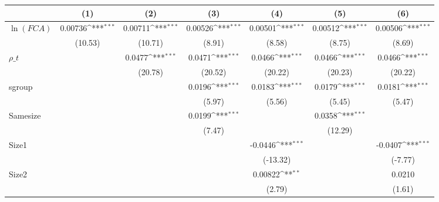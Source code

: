 {
\def\sym#1{\ifmmode^{#1}\else\(^{#1}\)\fi}
\begin{tabular}{l*{6}{c}}
\hline\hline
                    &\multicolumn{1}{c}{(1)}         &\multicolumn{1}{c}{(2)}         &\multicolumn{1}{c}{(3)}         &\multicolumn{1}{c}{(4)}         &\multicolumn{1}{c}{(5)}         &\multicolumn{1}{c}{(6)}         \\
\hline
$\ln(FCA)$          &     0.00736\sym{***}&     0.00711\sym{***}&     0.00526\sym{***}&     0.00501\sym{***}&     0.00512\sym{***}&     0.00506\sym{***}\\
                    &     (10.53)         &     (10.71)         &      (8.91)         &      (8.58)         &      (8.75)         &      (8.69)         \\
[1em]
 $ \rho\_t $         &                     &      0.0477\sym{***}&      0.0471\sym{***}&      0.0466\sym{***}&      0.0466\sym{***}&      0.0466\sym{***}\\
                    &                     &     (20.78)         &     (20.52)         &     (20.22)         &     (20.23)         &     (20.22)         \\
[1em]
sgroup              &                     &                     &      0.0196\sym{***}&      0.0183\sym{***}&      0.0179\sym{***}&      0.0181\sym{***}\\
                    &                     &                     &      (5.97)         &      (5.56)         &      (5.45)         &      (5.47)         \\
[1em]
Samesize            &                     &                     &      0.0199\sym{***}&                     &      0.0358\sym{***}&                     \\
                    &                     &                     &      (7.47)         &                     &     (12.29)         &                     \\
[1em]
Size1               &                     &                     &                     &     -0.0446\sym{***}&                     &     -0.0407\sym{***}\\
                    &                     &                     &                     &    (-13.32)         &                     &     (-7.77)         \\
[1em]
Size2               &                     &                     &                     &     0.00822\sym{**} &                     &      0.0210         \\
                    &                     &                     &                     &      (2.79)         &                     &      (1.61)         \\

\end{tabular}}

